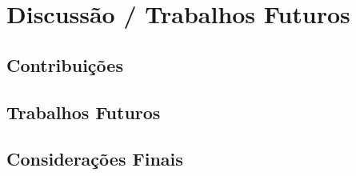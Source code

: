 \chapter{Discussão / Trabalhos Futuros}





\section{Contribuições}


\section{Trabalhos Futuros}






% 

\section{Considerações Finais}
